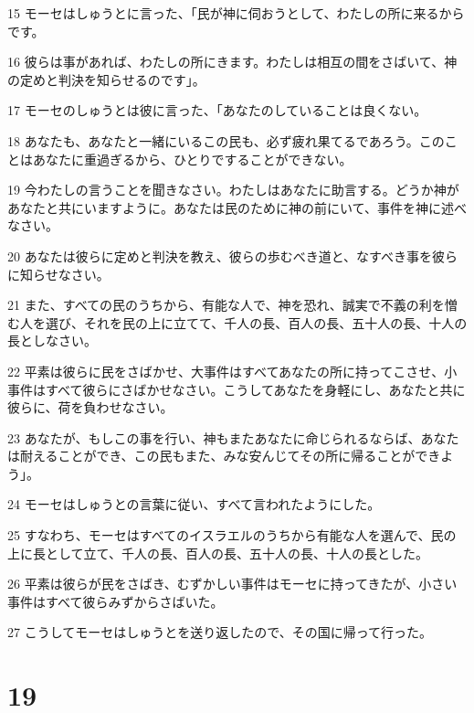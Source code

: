 \par 15 モーセはしゅうとに言った、「民が神に伺おうとして、わたしの所に来るからです。
\par 16 彼らは事があれば、わたしの所にきます。わたしは相互の間をさばいて、神の定めと判決を知らせるのです」。
\par 17 モーセのしゅうとは彼に言った、「あなたのしていることは良くない。
\par 18 あなたも、あなたと一緒にいるこの民も、必ず疲れ果てるであろう。このことはあなたに重過ぎるから、ひとりですることができない。
\par 19 今わたしの言うことを聞きなさい。わたしはあなたに助言する。どうか神があなたと共にいますように。あなたは民のために神の前にいて、事件を神に述べなさい。
\par 20 あなたは彼らに定めと判決を教え、彼らの歩むべき道と、なすべき事を彼らに知らせなさい。
\par 21 また、すべての民のうちから、有能な人で、神を恐れ、誠実で不義の利を憎む人を選び、それを民の上に立てて、千人の長、百人の長、五十人の長、十人の長としなさい。
\par 22 平素は彼らに民をさばかせ、大事件はすべてあなたの所に持ってこさせ、小事件はすべて彼らにさばかせなさい。こうしてあなたを身軽にし、あなたと共に彼らに、荷を負わせなさい。
\par 23 あなたが、もしこの事を行い、神もまたあなたに命じられるならば、あなたは耐えることができ、この民もまた、みな安んじてその所に帰ることができよう」。
\par 24 モーセはしゅうとの言葉に従い、すべて言われたようにした。
\par 25 すなわち、モーセはすべてのイスラエルのうちから有能な人を選んで、民の上に長として立て、千人の長、百人の長、五十人の長、十人の長とした。
\par 26 平素は彼らが民をさばき、むずかしい事件はモーセに持ってきたが、小さい事件はすべて彼らみずからさばいた。
\par 27 こうしてモーセはしゅうとを送り返したので、その国に帰って行った。

\chapter{19}

